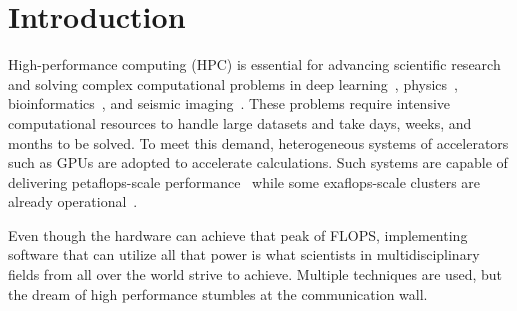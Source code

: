\documentclass[Ingles]{ic-tese-v3}
\begin{document}
\begin{abstract}

\end{abstract}




\listoffigures

\listoftables
\glsaddall
\printglossary[type=\acronymtype, title=List of Acronyms \& Glossary]







\tableofcontents


\fimdaspaginasiniciais


\chapter{Introduction}
\label{ch:intro}

High-performance computing (HPC) is essential for advancing scientific research and solving complex computational problems in deep learning~\cite{silvano2023survey}, physics~\cite{karp2025}, bioinformatics~\cite{mikailov2017}, and seismic imaging~\cite{okita2021,aldarwish2025}. These problems require intensive computational resources to handle large datasets and take days, weeks, and months to be solved. To meet this demand, heterogeneous systems of accelerators such as GPUs are adopted to accelerate calculations. Such systems are capable of delivering petaflops-scale performance~\cite{sdumont2} while some exaflops-scale clusters are already operational~\cite{top500}.

Even though the hardware can achieve that peak of FLOPS, implementing software that can utilize all that power is what scientists in multidisciplinary fields from all over the world strive to achieve. Multiple techniques are used, but the dream of high performance stumbles at the communication wall.
\end{document}
